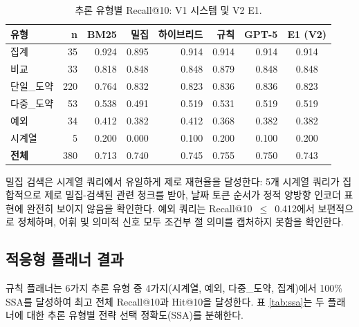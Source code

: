 \documentclass[11pt, a4paper]{article}
\begin{document}
\begin{table}[htbp]
\centering
\caption{추론 유형별 Recall@10: V1 시스템 및 V2 E1.}
\label{tab:by_type}
\begin{tabular}{lrrrrrr|c}
\toprule
\textbf{유형} & \textbf{n} & \textbf{BM25} & \textbf{밀집} & \textbf{하이브리드} & \textbf{규칙} & \textbf{GPT-5} & \textbf{E1 (V2)} \\
\midrule
집계     & 35  & 0.924 & 0.895 & 0.914 & 0.914 & 0.914 & 0.914 \\
비교     & 33  & 0.818 & 0.848 & 0.848 & 0.879 & 0.848 & 0.848 \\
단일\_도약 & 220 & 0.764 & 0.832 & 0.823 & 0.836 & 0.836 & 0.823 \\
다중\_도약 & 53  & 0.538 & 0.491 & 0.519 & 0.531 & 0.519 & 0.519 \\
예외     & 34  & 0.412 & 0.382 & 0.412 & 0.368 & 0.382 & 0.382 \\
시계열   & 5   & 0.200 & 0.000 & 0.100 & 0.200 & 0.100 & 0.200 \\
\midrule
\textbf{전체} & 380 & 0.713 & 0.740 & 0.745 & 0.755 & 0.750 & 0.743 \\
\bottomrule
\end{tabular}
\end{table}

\FloatBarrier

밀집 검색은 시계열 쿼리에서 유일하게 제로 재현율을 달성한다: 5개 시계열 쿼리가 집합적으로 제로 밀집-검색된 관련 청크를 받아, 날짜 토큰 순서가 정적 양방향 인코더 표현에 완전히 보이지 않음을 확인한다. 예외 쿼리는 Recall@10~$\leq$~0.412에서 보편적으로 정체하며, 어휘 및 의미적 신호 모두 조건부 절 의미를 캡처하지 못함을 확인한다.

\subsection{적응형 플래너 결과}

규칙 플래너는 6가지 추론 유형 중 4가지(시계열, 예외, 다중\_도약, 집계)에서 100\% SSA를 달성하여 최고 전체 Recall@10과 Hit@10을 달성한다. 표 \ref{tab:ssa}는 두 플래너에 대한 추론 유형별 전략 선택 정확도(SSA)를 분해한다.
\end{document}

